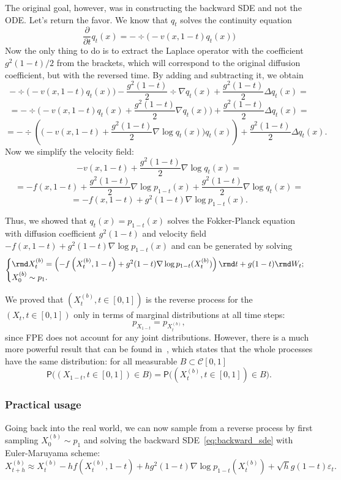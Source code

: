 The original goal, however, was in constructing the backward SDE and not the ODE. Let's return the favor. We know that $q_t$ solves the continuity equation
\[
    \frac{\partial}{\partial t}q_t(x) = -\div\Big(-v(x, 1 - t)q_t(x)\Big)
\]
Now the only thing to do is to extract the Laplace operator with the coefficient $g^2(1 - t)/2$ from the brackets, which will correspond to the original diffusion coefficient, but with the reversed time. By adding and subtracting it, we obtain
\[
    -\div\Big(-v(x, 1 - t)q_t(x)\Big) - \frac{g^2(1-t)}{2} \div \nabla q_t(x) + \frac{g^2(1 - t)}{2} \Delta q_t(x) = 
\]
\[
    = -\div\Big(-v(x, 1 - t)q_t(x) + \frac{g^2(1 - t)}{2}\nabla q_t(x)\Big) + \frac{g^2(1 - t)}{2} \Delta q_t(x) = 
\]
\[
    = -\div\left(\Big(-v(x, 1 - t) + \frac{g^2(1 - t)}{2} \nabla \log q_t(x) \Big) q_t(x)\right) + \frac{g^2(1 - t)}{2} \Delta q_t(x).
\]
Now we simplify the velocity field:
\[
    -v(x, 1 - t) + \frac{g^2(1 - t)}{2} \nabla \log q_t(x) =
\]
\[
    = -f(x, 1 - t) + \frac{g^2(1 - t)}{2} \nabla \log p_{1 - t}(x) + \frac{g^2(1 - t)}{2} \nabla \log q_t(x) =
\]
\[
    = -f(x, 1 - t) + g^2(1 - t) \nabla \log p_{1 - t}(x).
\]

Thus, we showed that $q_t(x) = p_{1 - t}(x)$ solves the Fokker-Planck equation with diffusion coefficient $g^2(1 - t)$ and velocity field $-f(x, 1 - t) + g^2(1 - t)\nabla \log p_{1 - t}(x)$ and can be generated by solving
\begin{equation}\label{eq:backward_sde}
    \begin{cases}
    \rmd X^{(b)}_t = \left(-f\left(X^{(b)}_t, 1 -t\right) + g^2(1 - t) \nabla \log p_{1 - t}(X^{(b)}_t) \right)\rmd t + g(1 - t) \rmd W_t;\\
    X_0^{(b)} \sim p_1.
    \end{cases}
\end{equation}

We proved that $(X_t^{(b)}, t \in [0, 1])$ is the reverse process for the $(X_t, t \in [0, 1])$ only in terms of marginal distributions at all time steps:
\[
    p_{X_{1 - t}} = p_{X_t^{(b)}},
\]
since FPE does not account for any joint distributions. However, there is a much more powerful result that can be found in~\cite{anderson1982reverse}, which states that the whole processes have the same distribution: for all measurable $B \subset \mathcal{C}[0, 1]$
\[
    \mathsf{P}\Big((X_{1 - t}, t \in [0, 1]) \in B\Big) = \mathsf{P}\Big((X_t^{(b)}, t \in [0, 1]) \in B\Big).
\]

\subsubsection{Practical usage}
Going back into the real world, we can now sample from a reverse process by first sampling $X^{(b)}_0 \sim p_1$ and solving the backward SDE~\ref{eq:backward_sde} with Euler-Maruyama scheme:
\[
    X^{(b)}_{t + h} \approx X^{(b)}_t - h f(X^{(b)}_t, 1 - t) + h g^2(1 - t) \nabla \log p_{1 - t}(X_t^{(b)}) + \sqrt{h} g(1 - t) \varepsilon_t.
\]

